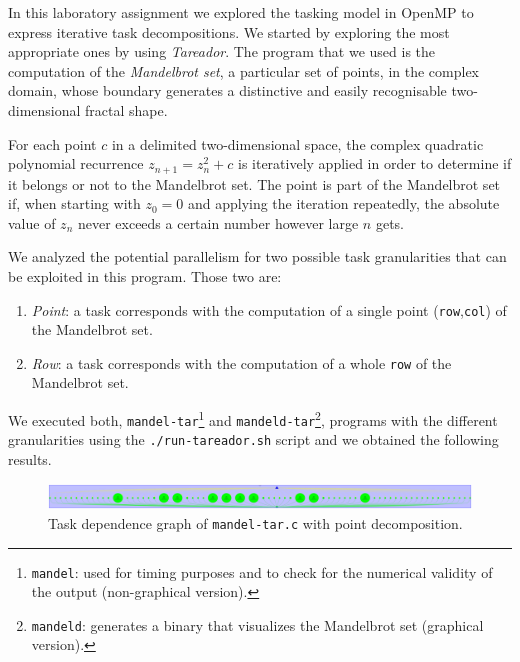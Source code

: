 In this laboratory assignment we explored the tasking model in OpenMP to express iterative task decompositions. 
We started by exploring the most appropriate ones by using \emph{Tareador}. The program that we used is the computation of the \emph{Mandelbrot set}, a particular set of points, in the complex domain, whose boundary generates a distinctive and easily recognisable two-dimensional fractal shape.

For each point $c$ in a delimited two-dimensional space, the complex quadratic polynomial recurrence $z_{n+1} = z^2_n + c$ is iteratively applied in order to determine if it belongs or not to the Mandelbrot set.  The point is part of the Mandelbrot set if, when starting with $z_0 = 0$ and applying the iteration repeatedly, the absolute value of $z_n$ never exceeds a certain number however large $n$ gets.

We analyzed the potential parallelism for two possible task granularities that can be exploited in this program. Those two are:
\begin{enumerate}[label=\alph*)]
\item \emph{Point}: a task corresponds with the computation of a single point (\texttt{row},\texttt{col}) of the Mandelbrot set.
\item \emph{Row}: a task corresponds with the computation of a whole \texttt{row} of the Mandelbrot set.
\end{enumerate}

We executed both, \texttt{mandel-tar}\footnote{\texttt{mandel}: used for timing purposes and to check for the numerical validity of the output (non-graphical version).} and \texttt{mandeld-tar}\footnote{\texttt{mandeld}: generates a binary that visualizes the Mandelbrot set (graphical version).}, programs with the different granularities using the \texttt{./run-tareador.sh} script and we obtained the following results.

\begin{figure}[H]
\centering
\includegraphics[width=\textwidth]{plots/dependency_graph_mandel_point.png}
\caption{Task dependence graph of \texttt{mandel-tar.c} with point decomposition.}
\label{graph:mandel_point}
\end{figure}


